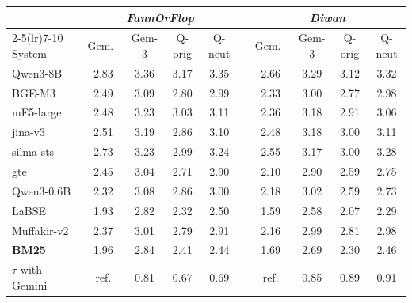 \begin{tabular}{l cccc c cccc}
\toprule
& \multicolumn{4}{c}{\textit{FannOrFlop}} & & \multicolumn{4}{c}{\textit{Diwan}} \\
\cmidrule(lr){2-5}\cmidrule(lr){7-10}
System & Gem.\ & Gem-3 & Q-orig & Q-neut & & Gem.\ & Gem-3 & Q-orig & Q-neut \\
\midrule
Qwen3-8B & 2.83 & 3.36 & 3.17 & 3.35 & & 2.66 & 3.29 & 3.12 & 3.32 \\
BGE-M3 & 2.49 & 3.09 & 2.80 & 2.99 & & 2.33 & 3.00 & 2.77 & 2.98 \\
mE5-large & 2.48 & 3.23 & 3.03 & 3.11 & & 2.36 & 3.18 & 2.91 & 3.06 \\
jina-v3 & 2.51 & 3.19 & 2.86 & 3.10 & & 2.48 & 3.18 & 3.00 & 3.11 \\
silma-sts & 2.73 & 3.23 & 2.99 & 3.24 & & 2.55 & 3.17 & 3.00 & 3.28 \\
gte & 2.45 & 3.04 & 2.71 & 2.90 & & 2.10 & 2.90 & 2.59 & 2.75 \\
Qwen3-0.6B & 2.32 & 3.08 & 2.86 & 3.00 & & 2.18 & 3.02 & 2.59 & 2.73 \\
LaBSE & 1.93 & 2.82 & 2.32 & 2.50 & & 1.59 & 2.58 & 2.07 & 2.29 \\
Muffakir-v2 & 2.37 & 3.01 & 2.79 & 2.91 & & 2.16 & 2.99 & 2.81 & 2.98 \\
\midrule
\textbf{BM25} & 1.96 & 2.84 & 2.41 & 2.44 & & 1.69 & 2.69 & 2.30 & 2.46 \\
\midrule
$\tau$ with Gemini & ref. & 0.81 & 0.67 & 0.69 & & ref. & 0.85 & 0.89 & 0.91 \\
\bottomrule
\end{tabular}
